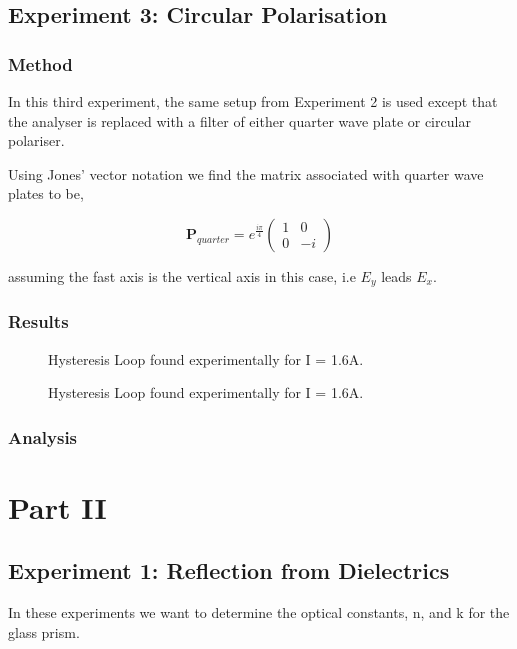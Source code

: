 \documentclass{article}
\begin{document}
\subsection{Experiment 3: Circular Polarisation}
\subsubsection{Method}
In this third experiment, the same setup from Experiment 2 is used 
except that the analyser is replaced with a filter of either quarter 
wave plate or circular polariser.

Using Jones' vector notation we find the matrix associated with quarter 
wave plates to be,

\begin{equation}
    \textbf{P}_{quarter} = e^{\frac{i\pi}{4}}\begin{pmatrix}
        1 & 0 \\
        0 & -i
    \end{pmatrix}
\end{equation}

assuming the fast axis is the vertical axis in this case, i.e $E_y$ leads 
$E_x$. 

\subsubsection{Results}
\begin{figure} [H]
    \centering
    \scalebox{0.75}{}
    \label{fig:quarter_wave}
    \caption{Hysteresis Loop found experimentally for I = 1.6A.}
\end{figure}

\begin{figure} [H]
    \centering
    \scalebox{0.75}{}
    \label{fig:circ}
    \caption{Hysteresis Loop found experimentally for I = 1.6A.}
\end{figure}
\subsubsection{Analysis}

\section{Part II}
\subsection{Experiment 1: Reflection from Dielectrics}
In these experiments we want to determine the optical constants, n,
and k for the glass prism.
\end{document}
